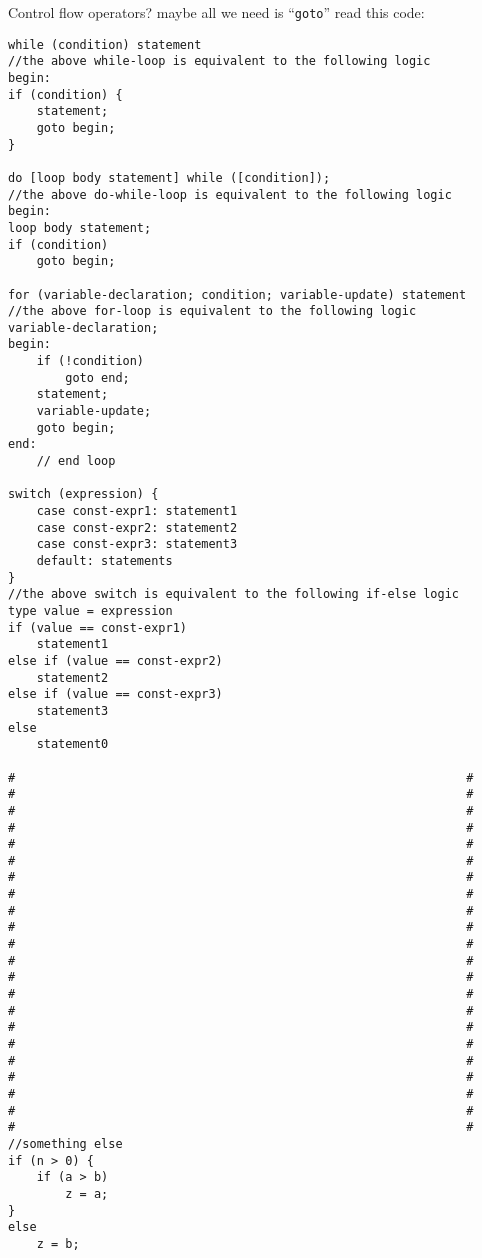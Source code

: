 Control flow operators? maybe all we need is ``\texttt{goto}'' read this
code:

\begin{verbatim}
while (condition) statement
//the above while-loop is equivalent to the following logic
begin:
if (condition) {
    statement;
    goto begin;
}

do [loop body statement] while ([condition]);
//the above do-while-loop is equivalent to the following logic
begin:
loop body statement;
if (condition)
    goto begin;

for (variable-declaration; condition; variable-update) statement
//the above for-loop is equivalent to the following logic
variable-declaration;
begin:
    if (!condition)
        goto end;
    statement;
    variable-update;
    goto begin;
end:
    // end loop 

switch (expression) {
    case const-expr1: statement1
    case const-expr2: statement2
    case const-expr3: statement3
    default: statements
}
//the above switch is equivalent to the following if-else logic
type value = expression
if (value == const-expr1)
    statement1
else if (value == const-expr2)
    statement2
else if (value == const-expr3)
    statement3
else
    statement0

#                                                               #
#                                                               #
#                                                               #
#                                                               #
#                                                               #
#                                                               #
#                                                               #
#                                                               #
#                                                               #
#                                                               #
#                                                               #
#                                                               #
#                                                               #
#                                                               #
#                                                               #
#                                                               #
#                                                               #
#                                                               #
#                                                               #
#                                                               #
#                                                               #
#                                                               #
//something else
if (n > 0) {
    if (a > b)
        z = a;
}
else
    z = b;
\end{verbatim}

